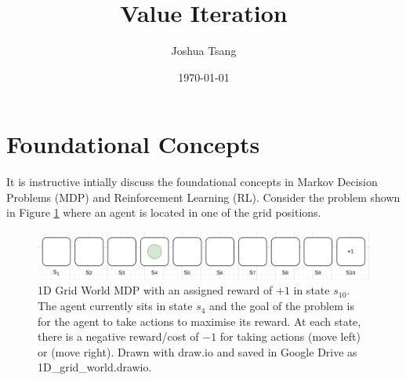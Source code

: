\documentclass[a4paper,11pt]{article}
\title{Value Iteration}
\author{Joshua Tsang}
\date{\today}
\begin{document}
\maketitle
\tableofcontents

\section{Foundational Concepts}

It is instructive intially discuss the foundational concepts in Markov Decision Problems (MDP) and Reinforcement Learning (RL).  Consider the problem shown in Figure \ref{fig:1d-grid-world-problem-statement} where an agent is located in one of the grid positions.

\begin{figure}
    \includegraphics[width=\textwidth]{images/1d-grid-world-problem-statement.png}
    \caption{1D Grid World MDP with an assigned reward of $+1$ in state $s_{10}$.  The agent currently sits in state $s_4$ and the goal of the problem is for the agent to take actions to maximise its reward.  At each state, there is a negative reward/cost of $-1$ for taking actions (move left) or (move right).  Drawn with draw.io and saved in Google Drive as 1D\_grid\_world.drawio.}
    \label{fig:1d-grid-world-problem-statement}
\end{figure}
\end{document}
